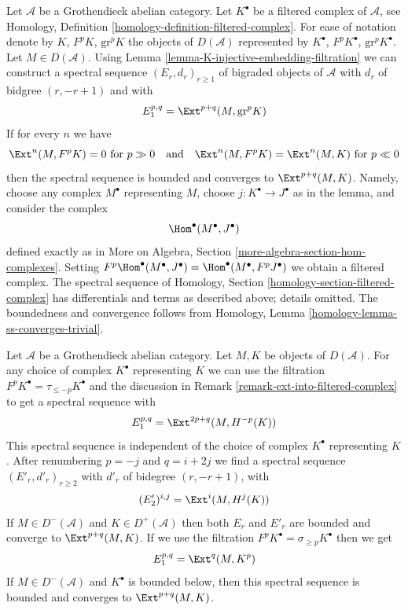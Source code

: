\begin{remark}
\label{remark-ext-into-filtered-complex}
Let $\mathcal{A}$ be a Grothendieck abelian category.
Let $K^\bullet$ be a filtered complex of $\mathcal{A}$, see
Homology, Definition \ref{homology-definition-filtered-complex}.
For ease of notation denote by $K$, $F^pK$, $\text{gr}^pK$ the
objects of $D(\mathcal{A})$ represented by $K^\bullet$,
$F^pK^\bullet$, $\text{gr}^pK^\bullet$. Let $M \in D(\mathcal{A})$.
Using Lemma \ref{lemma-K-injective-embedding-filtration}
we can construct a spectral sequence $(E_r, d_r)_{r \geq 1}$
of bigraded objects of $\mathcal{A}$ with $d_r$ of bidgree
$(r, -r + 1)$ and
with
$$
E_1^{p, q} = \Ext^{p + q}(M, \text{gr}^pK)
$$
If for every $n$ we have
$$
\Ext^n(M, F^pK) = 0 \text{ for } p \gg 0
\quad\text{and}\quad
\Ext^n(M, F^pK) = \Ext^n(M, K) \text{ for } p \ll 0
$$
then the spectral sequence is bounded and converges to $\Ext^{p + q}(M, K)$.
Namely, choose any complex $M^\bullet$ representing $M$, choose
$j : K^\bullet \to J^\bullet$ as in the lemma, and consider the complex
$$
\Hom^\bullet(M^\bullet, J^\bullet)
$$
defined exactly as in
More on Algebra, Section \ref{more-algebra-section-hom-complexes}.
Setting $F^p\Hom^\bullet(M^\bullet, J^\bullet) =
\Hom^\bullet(M^\bullet, F^pJ^\bullet)$ we obtain a filtered complex.
The spectral sequence of
Homology, Section \ref{homology-section-filtered-complex}
has differentials and terms as described above; details omitted.
The boundedness and convergence follows from
Homology, Lemma \ref{homology-lemma-ss-converges-trivial}.
\end{remark}

\begin{remark}
\label{remark-spectral-sequences-ext}
Let $\mathcal{A}$ be a Grothendieck abelian category.
Let $M, K$ be objects of $D(\mathcal{A})$.
For any choice of complex $K^\bullet$ representing $K$ we
can use the filtration $F^pK^\bullet = \tau_{\leq -p}K^\bullet$
and the discussion in Remark \ref{remark-ext-into-filtered-complex}
to get a spectral sequence with
$$
E_1^{p, q} = \Ext^{2p + q}(M, H^{-p}(K))
$$
This spectral sequence is independent of the choice of
complex $K^\bullet$ representing $K$. After renumbering
$p = -j$ and $q = i + 2j$ we find a spectral sequence
$(E'_r, d'_r)_{r \geq 2}$ with $d'_r$ of bidegree $(r, -r + 1)$, with
$$
(E'_2)^{i, j} = \Ext^i(M, H^j(K))
$$
If $M \in D^-(\mathcal{A})$ and $K \in D^+(\mathcal{A})$ then
both $E_r$ and $E'_r$ are bounded and converge to $\Ext^{p + q}(M, K)$.
If we use the filtration $F^pK^\bullet = \sigma_{\geq p}K^\bullet$
then we get
$$
E_1^{p, q} = \Ext^q(M, K^p)
$$
If $M \in D^-(\mathcal{A})$ and $K^\bullet$ is bounded below, then
this spectral sequence is bounded and converges to $\Ext^{p + q}(M, K)$.
\end{remark}

